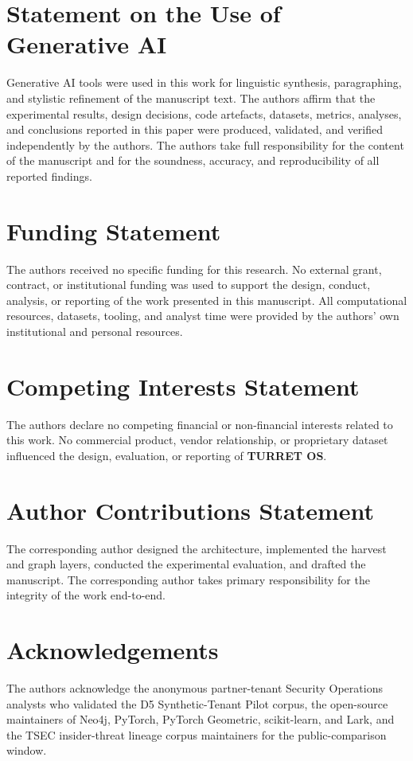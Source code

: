 \section*{Statement on the Use of Generative AI}

Generative AI tools were used in this work for linguistic synthesis, paragraphing, and stylistic refinement of the manuscript text. The authors affirm that the experimental results, design decisions, code artefacts, datasets, metrics, analyses, and conclusions reported in this paper were produced, validated, and verified independently by the authors. The authors take full responsibility for the content of the manuscript and for the soundness, accuracy, and reproducibility of all reported findings.

\section*{Funding Statement}

The authors received no specific funding for this research. No external grant, contract, or institutional funding was used to support the design, conduct, analysis, or reporting of the work presented in this manuscript. All computational resources, datasets, tooling, and analyst time were provided by the authors' own institutional and personal resources.

\section*{Competing Interests Statement}

The authors declare no competing financial or non-financial interests related to this work. No commercial product, vendor relationship, or proprietary dataset influenced the design, evaluation, or reporting of \textbf{TURRET OS}.

\section*{Author Contributions Statement}

The corresponding author designed the architecture, implemented the harvest and graph layers, conducted the experimental evaluation, and drafted the manuscript. The corresponding author takes primary responsibility for the integrity of the work end-to-end.

\section*{Acknowledgements}

The authors acknowledge the anonymous partner-tenant Security Operations analysts who validated the D5 Synthetic-Tenant Pilot corpus, the open-source maintainers of Neo4j, PyTorch, PyTorch Geometric, scikit-learn, and Lark, and the TSEC insider-threat lineage corpus maintainers for the public-comparison window.
